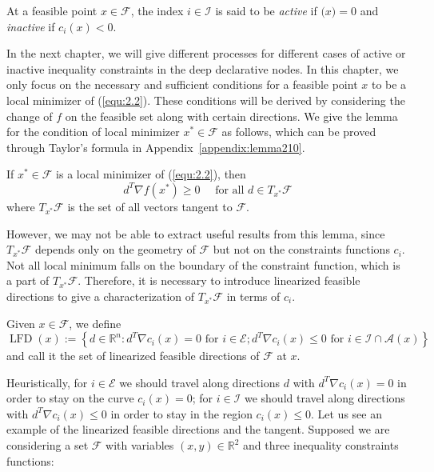 \begin{defn}
    At a feasible point $x \in \mathscr{F}$, the index $i \in \mathscr{I}$ is said to be \emph{active} if $\mathscr(x) = 0$ and \emph{inactive} if $c_i(x) < 0$.  
\end{defn}
\par In the next chapter, we will give different processes for different cases of active or inactive inequality constraints in the deep declarative nodes. In this chapter, we only focus on the necessary and sufficient conditions for a feasible point $x$ to be a local minimizer of (\ref{equ:2.2}). These conditions will be derived by considering the change of $f$ on the feasible set along with certain directions. We give the lemma for the condition of local minimizer $x^* \in \mathscr{F}$ as follows, which can be proved through Taylor’s formula in Appendix~\ref{appendix:lemma210}.
\begin{lemma}
    \label{lemma:210}
    If $x^* \in \mathscr{F}$ is a local minimizer of (\ref{equ:2.2}), then
    $$
    d^{T} \nabla f\left(x^{*}\right) \geq 0 \quad \textrm { for all } d \in T_{x^{*}} \mathscr{F}
    $$
    where $T_{x^{*}} \mathscr{F}$ is the set of all vectors tangent to $\mathscr{F}$. 
\end{lemma}
\par However, we may not be able to extract useful results from this lemma, since $T_{x^{*}} \mathscr{F}$ depends only on the geometry of $\mathscr{F}$ but not on the constraints functions $c_i$. Not all local minimum falls on the boundary of the constraint function, which is a part of $T_{x^{*}} \mathscr{F}$. Therefore, it is necessary to introduce linearized feasible directions to give a characterization of $T_{x^{*}} \mathscr{F}$ in terms of $c_i$. 
\begin{defn}
    \label{defn:lfd}
    Given $x \in \mathscr{F}$, we define
    $$
    \operatorname{LFD}(x):=\left\{d \in \mathbb{R}^{n}: d^{T} \nabla c_{i}(x)=0 \text { for } i \in \mathscr{E} ; d^{T} \nabla c_{i}(x) \leq 0 \textrm { for } i \in \mathscr{I} \cap \mathscr{A}(x)\right\}
    $$
    and call it the set of linearized feasible directions of $\mathscr{F}$ at $x$. 
\end{defn}
\par Heuristically, for $i \in \mathscr{E}$ we should travel along directions $d$ with $d^{T} \nabla c_{i}(x)=0$ in order to stay on the curve $c_i(x)=0$; for $i \in \mathscr{I}$ we should travel along directions with $d^{T} \nabla c_{i}(x) \leq 0$ in order to stay in the region $c_i(x) \leq 0$. 
Let us see an example of the linearized feasible directions and the tangent. Supposed we are considering a set $\mathscr{F}$ with variables $(x,y) \in \mathbb{R}^2$ and three inequality constraints functions: 
